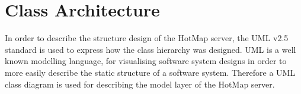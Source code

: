 \section{Class Architecture}

In order to describe the structure design of the HotMap server, the UML v2.5 standard is used to express how the class hierarchy was designed. UML is a well known modelling language, for visualising software system designs in order to more easily describe the static structure of a software system.
Therefore a UML class diagram is used for describing the model layer of the HotMap server.
